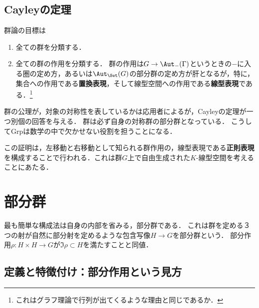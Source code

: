 \documentclass[uplatex,dvipdfmx]{jsreport}
\begin{document}
\subsection{Cayleyの定理}

\begin{tcolorbox}[colframe=ForestGreen, colback=ForestGreen!10!white,breakable,colbacktitle=ForestGreen!40!white,coltitle=black,fonttitle=\bfseries\sffamily,
title=半直積と同様，自己言及という構造]
    群論の目標は
    \begin{enumerate}
        \item 全ての群を分類する．
        \item 全ての群の作用を分類する．
        群の作用は$G\to\Aut_{-}(\Gamma)$というときの$-$に入る圏の定め方，あるいは$\Aut_\Set(G)$の部分群の定め方が肝となるが，特に，集合への作用である\textbf{置換表現}，そして線型空間への作用である\textbf{線型表現}である．\footnote{これはグラフ理論で行列が出てくるような理由と同じであるか．}
    \end{enumerate}
    群の公理が，対象の対称性を表しているかは応用者によるが，Cayleyの定理が一つ別個の回答を与える．
    群は必ず自身の対称群の部分群となっている．
    こうしてGrpは数学の中で欠かせない役割を担うことになる．

    この証明は，左移動と右移動として知られる群作用の，線型表現である\textbf{正則表現}を構成することで行われる．これは群$G$上で自由生成された$K$-線型空間を考えることにあたる．
\end{tcolorbox}

\section{部分群}

\begin{tcolorbox}[colframe=ForestGreen, colback=ForestGreen!10!white, breakable ,colbacktitle=ForestGreen!40!white, coltitle=black,fonttitle=\bfseries\sffamily,
    title=包含写像が定める構成]
    最も簡単な構成法は自身の内部を省みる，部分群である．
    これは群を定める３つの射が自然に部分射を定めるような包含写像$H\to G$を部分群という．
    部分作用$\rho:H\times H\to G$が$\Im\rho\subset H$を満たすことと同値．

\end{tcolorbox}

\subsection{定義と特徴付け：部分作用という見方}
\end{document}
